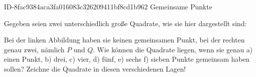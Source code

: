 \begin{exercise}
      {ID-8fac9384aca3fa016083c326209411bf8cd1b962}
      {Gemeinsame Punkte}
  \ifproblem\problem\par
    Gegeben seien zwei unterschiedlich große Quadrate, wie sie hier dargestellt
    sind:
    \begin{center}
    \end{center}
    Bei der linken Abbildung haben sie keinen gemeinsamen Punkt, bei der
    rechten genau zwei, nämlich $P$ und $Q$. Wie können die Quadrate liegen,
    wenn sie genau a) einen Punkt, b) drei, c) vier, d) fünf, e) sechs f) sieben
    Punkte gemeinsam haben sollen? Zeichne die Quadrate in diesen verschiedenen Lagen!
  \fi
\end{exercise}

